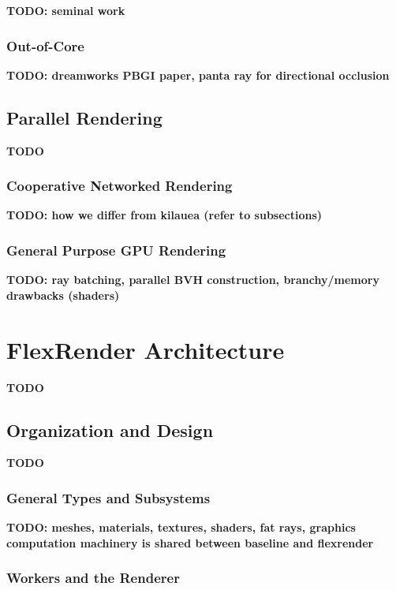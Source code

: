 \documentclass[12pt]{ucthesis}
\begin{document}
\textbf{TODO: seminal work}

\subsection{Out-of-Core}
\label{outofcore}

\textbf{TODO: dreamworks PBGI paper, panta ray for directional occlusion}

\section{Parallel Rendering}
\label{parallelbg}

\textbf{TODO}

\subsection{Cooperative Networked Rendering}
\label{networked}

\textbf{TODO: how we differ from kilauea (refer to subsections) \cite{kato:2002}}

\subsection{General Purpose GPU Rendering}
\label{gpgpu}

\textbf{TODO: ray batching, parallel BVH construction, branchy/memory drawbacks (shaders)}

\chapter{FlexRender Architecture}
\label{architecture}

\textbf{TODO}

\section{Organization and Design}
\label{organization}

\textbf{TODO}

\subsection{General Types and Subsystems}
\label{types}

\textbf{TODO: meshes, materials, textures, shaders, fat rays, graphics computation machinery is shared between baseline and flexrender}

\subsection{Workers and the Renderer}
\label{workers}
\end{document}

